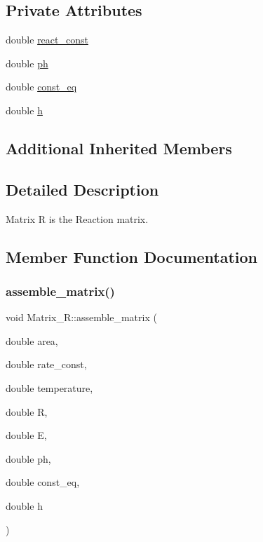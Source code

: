 \subsection*{Private Attributes}
\begin{DoxyCompactItemize}
\item 
double \hyperlink{classMatrix__R_af2872298a4ebd9ac7493a1f55e3fa586}{react\+\_\+const}
\item 
double \hyperlink{classMatrix__R_ae8345433c06d0d0249c09783c4ff80bc}{ph}
\item 
double \hyperlink{classMatrix__R_ab5ca8aff010e279569065f76d28c4437}{const\+\_\+eq}
\item 
double \hyperlink{classMatrix__R_ac5bb79872f4324d89760f8047a1e63a4}{h}
\end{DoxyCompactItemize}
\subsection*{Additional Inherited Members}


\subsection{Detailed Description}
Matrix R is the Reaction matrix. 

\subsection{Member Function Documentation}
\mbox{\label{classMatrix__R_ae09d3c9f7420ecec1f61313a78cd1ce9}} 
\subsubsection{\texorpdfstring{assemble\+\_\+matrix()}{assemble\_matrix()}}
{\footnotesize\ttfamily void Matrix\+\_\+\+R\+::assemble\+\_\+matrix (\begin{DoxyParamCaption}\item[{double}]{area,  }\item[{double}]{rate\+\_\+const,  }\item[{double}]{temperature,  }\item[{double}]{R,  }\item[{double}]{E,  }\item[{double}]{ph,  }\item[{double}]{const\+\_\+eq,  }\item[{double}]{h }\end{DoxyParamCaption})}

